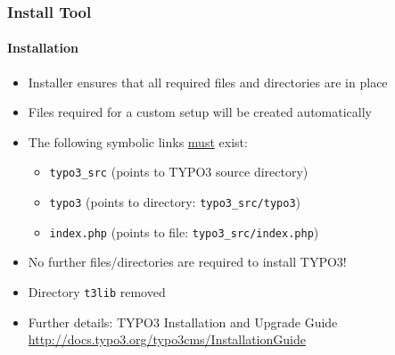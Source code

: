 
\begin{frame}[fragile]

	\frametitle{Install Tool}
	\framesubtitle{Installation}

	\begin{itemize}
		\item Installer ensures that all required files and directories are in place
		\item Files required for a custom setup will be created automatically
		\item The following symbolic links \underline{must} exist:

		\begin{itemize}
			\item \texttt{typo3\_src}	\tabto{2cm} (points to TYPO3 source directory)
			\item \texttt{typo3}		\tabto{2cm} (points to directory: \texttt{typo3\_src/typo3})
			\item \texttt{index.php}	\tabto{2cm} (points to file: \texttt{typo3\_src/index.php})
		\end{itemize}

		\item No further files/directories are required to install TYPO3!
		\item Directory \texttt{t3lib} removed
		\item Further details: TYPO3 Installation and Upgrade Guide\newline
			\url{http://docs.typo3.org/typo3cms/InstallationGuide}

	\end{itemize}

\end{frame}


